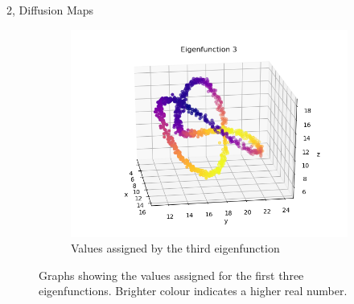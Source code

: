 \documentclass[10pt,a4paper]{article}
\begin{document}
\begin{task}{2, Diffusion Maps}
\begin{figure}[H]
\begin{subfigure}[b]{0.475\textwidth}
\centering
\includegraphics[width=\textwidth]{../plots/task2/task2_3_eigenfunction3.png}
\caption[]{{\small Values assigned by the third eigenfunction}}
\label{fig:task2_part3_3}
\end{subfigure}
\quad
\caption{Graphs showing the values assigned for the first three eigenfunctions. Brighter colour indicates a higher real number.}
\label{fig:task2_part3}
\end{figure}

\end{task}
\end{document}

